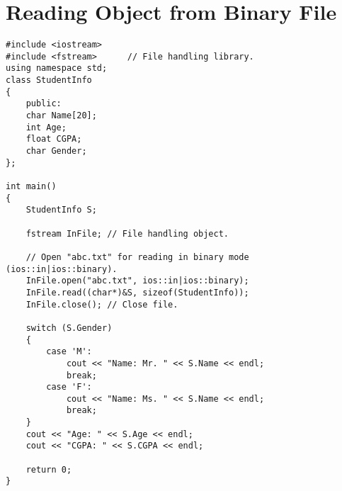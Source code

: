\documentclass[12pt,a4paper]{article}
\begin{document}
\section{Reading Object from Binary File}
\begin{lstlisting}[caption={Reading an object from binary file}]
#include <iostream>
#include <fstream>		// File handling library.
using namespace std;
class StudentInfo
{
	public:
	char Name[20];
	int Age;
	float CGPA;
	char Gender;
};

int main()
{
	StudentInfo S;

	fstream InFile;	// File handling object.

	// Open "abc.txt" for reading in binary mode (ios::in|ios::binary).
	InFile.open("abc.txt", ios::in|ios::binary);
	InFile.read((char*)&S, sizeof(StudentInfo));
	InFile.close();	// Close file.

	switch (S.Gender)
	{
		case 'M':
			cout << "Name: Mr. " << S.Name << endl;
			break;
		case 'F':
			cout << "Name: Ms. " << S.Name << endl;
			break;
	}
	cout << "Age: " << S.Age << endl;
	cout << "CGPA: " << S.CGPA << endl;

	return 0;
}
\end{lstlisting}
%
%
\end{document}
